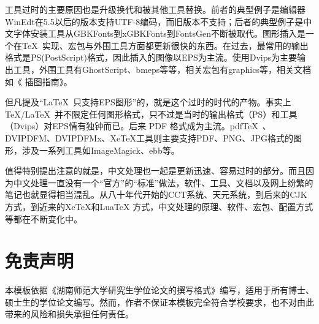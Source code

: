 工具过时的主要原因也是升级换代和被其他工具替换。前者的典型例子是编辑器WinEdt在5.5以后的版本支持UTF-8编码，而旧版本不支持；后者的典型例子是中文字体安装工具从GBKFonts到xGBKFonts到FontsGen不断被取代。图形插入是一个在\TeX~实现、宏包与外围工具方面都更新很快的东西。在过去，最常用的输出格式是PS(PostScript)格式，因此插入的图像以EPS为主流。使用Dvips为主要输出工具，外围工具有GhostScript、bmeps等等，相关宏包有graphics等，相关文档如《\LaTeXe{} 插图指南》。

但凡提及“\LaTeX~只支持EPS图形”的，就是这个过时的时代的产物。事实上\TeX/\LaTeX~并不限定任何图形格式，只不过是当时的输出格式（PS）和工具（Dvips）对EPS情有独钟而已。后来 PDF 格式成为主流。pdf\TeX~、DVIPDFM、DVIPDFMx、XeTeX工具则主要支持PDF、PNG、JPG格式的图形，涉及一系列工具如ImageMagick、ebb等。

值得特别提出注意的就是，中文处理也一起是更新迅速、容易过时的部分。而且因为中文处理一直没有一个“官方”的“标准”做法，软件、工具、文档以及网上纷繁的笔记也就显得相当混乱。从八十年代开始的CCT系统、天元系统，到后来的CJK方式，到近来的XeTeX和LuaTeX 方式，中文处理的原理、软件、宏包、配置方式等都在不断变化中。
\section{免责声明}
本模板依据《湖南师范大学研究生学位论文的撰写格式》编写，适用于所有博士、硕士生的学位论文编写。然而，作者不保证本模板完全符合学校要求，也不对由此带来的风险和损失承担任何责任。
